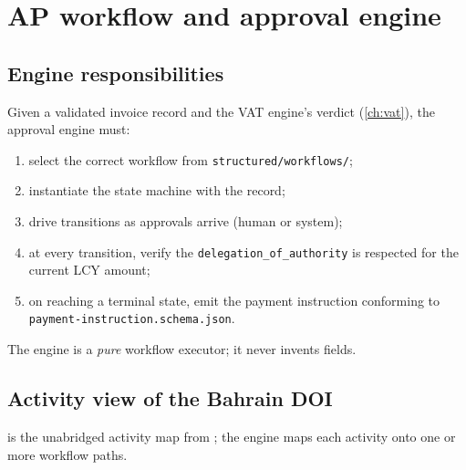 \chapter{AP workflow and approval engine}\label{ch:ap}

\section{Engine responsibilities}

Given a validated invoice record and the VAT engine's verdict
(\cref{ch:vat}), the approval engine must:

\begin{enumerate}
  \item select the correct workflow from
        \corpus\texttt{structured/workflows/};
  \item instantiate the state machine with the record;
  \item drive transitions as approvals arrive (human or system);
  \item at every transition, verify the
        \texttt{delegation\_of\_authority} is respected for the current
        LCY amount;
  \item on reaching a terminal state, emit the payment instruction
        conforming to \texttt{payment-instruction.schema.json}.
\end{enumerate}

The engine is a \emph{pure} workflow executor; it never invents fields.

\section{Activity view of the Bahrain DOI}

 is the unabridged activity map from
\corpus{}; the
engine maps each activity onto one or more workflow paths.

